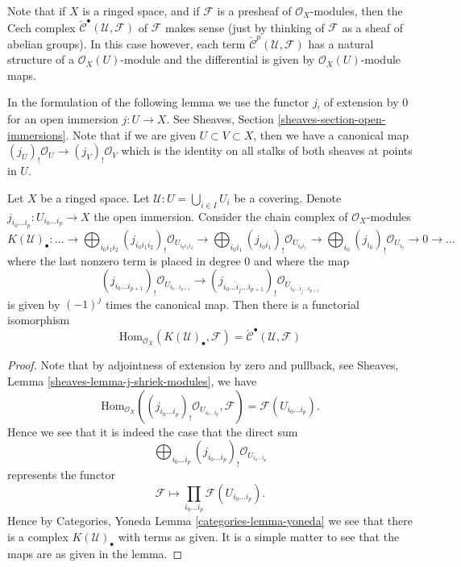 \noindent
Note that if $X$ is a ringed space, and if $\mathcal{F}$ is a presheaf
of $\mathcal{O}_X$-modules, then the Cech complex
$\check{\mathcal{C}}^\bullet(\mathcal{U}, \mathcal{F})$
of $\mathcal{F}$ makes sense (just by thinking of $\mathcal{F}$
as a sheaf of abelian groups). In this case however, each term
$\check{\mathcal{C}}^p(\mathcal{U}, \mathcal{F})$ has a natural
structure of a $\mathcal{O}_X(U)$-module and the differential is given by
$\mathcal{O}_X(U)$-module maps.

\medskip\noindent
In the formulation of the following lemma we use the functor $j_!$ of
extension by $0$ for an open immersion $j : U \to X$. See
Sheaves, Section \ref{sheaves-section-open-immersions}. Note that
if we are given $U \subset V \subset X$, then we have a canonical
map $(j_U)_!\mathcal{O}_U \to (j_V)_!\mathcal{O}_V$ which is the
identity on all stalks of both sheaves at points in $U$.

\begin{lemma}
\label{lemma-cech-map-into}
Let $X$ be a ringed space.
Let $\mathcal{U} : U = \bigcup_{i \in I} U_i$ be a covering.
Denote $j_{i_0\ldots i_p} : U_{i_0 \ldots i_p} \to X$ the open immersion.
Consider the chain complex of $\mathcal{O}_X$-modules
$$
K(\mathcal{U})_\bullet :
\ldots
\to
\bigoplus_{i_0i_1i_2} (j_{i_0i_1i_2})_!\mathcal{O}_{U_{i_0i_1i_2}}
\to
\bigoplus_{i_0i_1} (j_{i_0i_1})_!\mathcal{O}_{U_{i_0i_1}}
\to
\bigoplus_{i_0} (j_{i_0})_!\mathcal{O}_{U_{i_0}}
\to 0 \to \ldots
$$
where the last nonzero term is placed in degree $0$
and where the map
$$
(j_{i_0\ldots i_{p + 1}})_!\mathcal{O}_{U_{i_0\ldots i_{p + 1}}}
\longrightarrow
(j_{i_0\ldots \hat i_j \ldots i_{p + 1}})_!
\mathcal{O}_{U_{i_0\ldots \hat i_j \ldots i_{p + 1}}}
$$
is given by $(-1)^j$ times the canonical map.
Then there is a functorial isomorphism
$$
\text{Hom}_{\mathcal{O}_X}(K(\mathcal{U})_\bullet, \mathcal{F})
=
\check{\mathcal{C}}^\bullet(\mathcal{U}, \mathcal{F})
$$
\end{lemma}

\begin{proof}
Note that by adjointness of extension by zero and pullback,
see Sheaves, Lemma \ref{sheaves-lemma-j-shriek-modules}, we have
$$
\text{Hom}_{\mathcal{O}_X}(
(j_{i_0\ldots i_p})_!\mathcal{O}_{U_{i_0\ldots i_p}},
\mathcal{F})
=
\mathcal{F}(U_{i_0\ldots i_p}).
$$
Hence we see that it is indeed the case that the direct sum
$$
\bigoplus_{i_0 \ldots i_p}
(j_{i_0 \ldots i_p})_!\mathcal{O}_{U_{i_0 \ldots i_p}}
$$
represents the functor
$$
\mathcal{F} \longmapsto \prod_{i_0\ldots i_p} \mathcal{F}(U_{i_0\ldots i_p}).
$$
Hence by Categories, Yoneda Lemma \ref{categories-lemma-yoneda}
we see that there is a complex $K(\mathcal{U})_\bullet$ with terms
as given. It is a simple matter to see that the maps are as given
in the lemma.
\end{proof}


